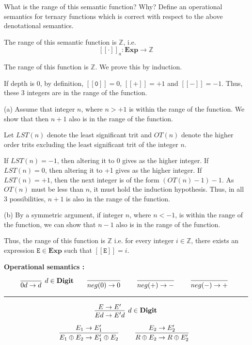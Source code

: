 \documentclass[a4paper,10pt]{article}
\newcommand{\E}{\mathtt{E}}
\newcommand{\Digit}{\mathbf{Digit}}
\newcommand{\denot}[1]{\mathtt{[[{#1}]]}}
\begin{document}
\begin{enumerate}
{What is the range of this semantic function? Why? Define an operational semantics for 
ternary functions which is correct with respect to the above denotational semantics.
}

The range of this semantic function is $\mathbb{Z}$, i.e.
$$\denot{\cdot}_a : \textbf{Exp} \rightarrow \mathbb{Z}$$

The range of this function is $\mathbb{Z}$. We prove this by induction.

If depth is 0, by definition, $\denot{0} = 0$, $\denot{+} = +1$ and
$\denot{-} = -1$. Thus, these 3 integers are in the range of the function.

(a) Assume that integer $n$, where $n > +1$ is within the range of the function.
We show that then $n+1$ also is in the range of the function. 

Let $LST(n)$ denote the least significant trit and $OT(n)$ denote the
higher order trits excluding the least significant trit of the integer $n$.

If $LST(n) = -1$, then altering it to 0 gives as the higher integer. 
If $LST(n) = 0$, then altering it to +1 gives as the higher integer. 
If $LST(n) = +1$, then the next integer is of the form $(OT(n)-1)-1$.
As $OT(n)$ must be less than $n$, it must hold the induction hypothesis.
Thus, in all 3 possibilities, $n+1$ is also in the range of the function.

(b) By a symmetric argument, if integer $n$, where $n < -1$, is 
within the range of the function, we can show that $n-1$ also is in the range of
the function.

Thus, the range of this function is $\mathbb{Z}$ i.e. for every integer 
$i \in \mathbb{Z}$, there exists an expression $\E \in \textbf{Exp}$ such that
$\denot{\E} = i$.

\vspace{0.3in}
\textbf{Operational semantics :}
\vspace{0.3in}

\[
\infer[d \in \Digit]
  {0d \rightarrow d}
  {}   
\qquad
\infer[] 
  {neg(0) \rightarrow 0}  
  {}    
\qquad
\infer[] 
  {neg(+) \rightarrow -}  
  {}    
\qquad
\infer[] 
  {neg(-) \rightarrow +}  
  {}    
\]

\hrule

\[
\infer[d \in \Digit]
  {Ed \rightarrow E'd}
  {E \rightarrow E'}
\]

\[
\infer[]
  {E_{1} \oplus E_{2} \rightarrow E_{1}' \oplus E_{2}}
  {E_{1} \rightarrow E_{1}'} 
\qquad
\infer[]
  {R \oplus E_{2} \rightarrow R \oplus E_{2}'}
  {E_{2} \rightarrow E_{2}'}
\]


\end{enumerate}
\end{document}
